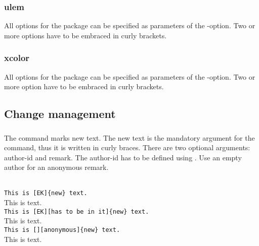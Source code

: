 \subsubsection{ulem}

All options for the  package can be specified as parameters of the -option.
Two or more options have to be embraced in curly brackets.




\subsubsection{xcolor}

All options for the  package can be specified as parameters of the -option.
Two or more option have to be embraced in curly brackets.




\subsection{Change management}
\label{sec:user:changemanagement}

\subsubsection{}
\DescribeMacro{\added}

The command  marks new text.
The new text is the mandatory argument for the command, thus it is written in curly braces.
There are two optional arguments: author-id and remark.
The author-id has to be defined using .
Use an empty author for an anonymous remark.

\begin{chusage}
		\>\\
	\usageexample
		\>\texttt{This is [EK]\{new\} text.}\\
		\>This is  text.\\
		\>\texttt{This is [EK][has to be in it]\{new\} text.}\\
		\>This is  text.\\
		\>\texttt{This is [][anonymous]\{new\} text.}\\
		\>This is  text.
\end{chusage}


